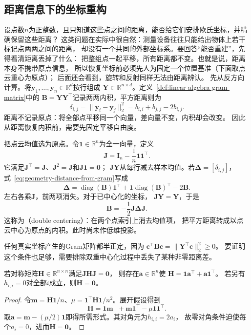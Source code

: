 \subsection{距离信息下的坐标重构}
\label{sec:geometry-distance-coordinate-embedding}

设点数$n$为正整数，且只知道这些点之间的距离，能否给它们安排欧氏坐标，并精确保留这些距离？
这类问题在实际中很自然：测量设备往往只能给出物体上若干标记点两两之间的距离，
却没有一个共同的外部坐标系。要回答“能否重建”，先得看清距离丢掉了什么：
把整组点一起平移，所有距离都不变。也就是说，距离本身不携带原点信息，
所以恢复坐标前必须先人为固定一个位置基准（下面取点云重心为原点）；
后面还会看到，旋转和反射同样无法由距离辨认。
先从反方向计算。将$\bm y_1,\ldots,\bm y_n\in\mathbb R^d$按行组成
$\bm Y\in\mathbb R^{n\times d}$。定义~\ref{def:linear-algebra-gram-matrix}中的
$\bm B=\bm Y\bm Y^\top$记录两两内积，平方距离则为
\begin{equation}
  \delta_{i,j}=\lVert\bm y_i-\bm y_j\rVert_2^2
  =b_{i,i}+b_{j,j}-2b_{i,j}.
  \label{eq:geometry-distance-from-gram}
\end{equation}
距离不记录原点：将全部点平移同一个向量，差向量不变，内积却会改变。
因此从距离恢复内积前，需要先固定平移自由度。

把点云均值选为原点。令$\bm1\in\mathbb R^n$为全一向量，定义
\begin{equation}
  \bm J=\bm I_n-\frac1n\bm1\bm1^\top.
  \label{eq:geometry-centering-matrix}
\end{equation}
它满足$\bm J^\top=\bm J$、$\bm J^2=\bm J$和$\bm J\bm1=\bm0$；
$\bm J\bm Y$从每行减去样本均值。若$\bm\Delta=[\delta_{i,j}]$，
式~\eqref{eq:geometry-distance-from-gram}写成
\[
  \bm\Delta=\operatorname{diag}(\bm B)\bm1^\top
  +\bm1\operatorname{diag}(\bm B)^\top-2\bm B.
\]
左右各乘$\bm J$，前两项消失。对于已中心化的坐标，
$\bm J\bm Y=\bm Y$，于是
\begin{equation}
  \bm B=-\frac12\bm J\bm\Delta\bm J.
  \label{eq:geometry-double-centering}
\end{equation}
这称为（double centering）：在两个点索引上消去均值项，
把平方距离转成以点云中心为原点的内积。此时尚未作低维投影。

任何真实坐标产生的Gram矩阵都半正定，因为
$\bm c^\top\bm B\bm c=\lVert\bm Y^\top\bm c\rVert_2^2\geq0$。
要证明这个条件也足够，需要排除双重中心化过程中丢失了某种非零距离差。

\begin{lemma}[双重中心化核的形式]
\label{lem:geometry-double-centering-kernel}
若对称矩阵$\bm H\in\mathbb R^{n\times n}$满足$\bm J\bm H\bm J=\bm0$，
则存在$\bm a\in\mathbb R^n$使
$\bm H=\bm1\bm a^\top+\bm a\bm1^\top$。
若另有$h_{i,i}=0$对全部$i$成立，则$\bm H=\bm0$。
\end{lemma}
\begin{proof}
令$\bm m=\bm H\bm1/n$、$\mu=\bm1^\top\bm H\bm1/n^2$。展开假设得到
\[
  \bm H=\bm1\bm m^\top+\bm m\bm1^\top-\mu\bm1\bm1^\top.
\]
取$\bm a=\bm m-(\mu/2)\bm1$即得所需形式。其对角元为$h_{i,i}=2a_i$，
故零对角条件迫使每个$a_i=0$，进而$\bm H=\bm0$。
\end{proof}

